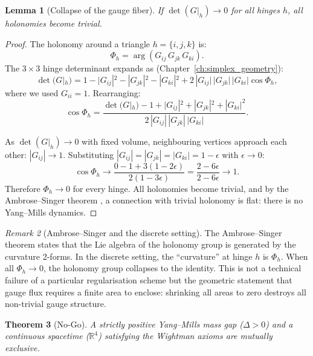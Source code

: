 \documentclass[12pt]{article}
\newtheorem{theorem}{Theorem}[section]
\newtheorem{lemma}[theorem]{Lemma}
\theoremstyle{remark}
\newtheorem{remark}[theorem]{Remark}
\theoremstyle{definition}
\newcommand{\RR}{\mathbb{R}}
\begin{document}
\begin{lemma}[Collapse of the gauge fiber]
\label{lem:fiber}
If $\det(G|_h) \to 0$ for all hinges $h$, all holonomies become
trivial.
\end{lemma}

\begin{proof}
The holonomy around a triangle $h = \{i, j, k\}$ is:
\begin{equation}
\Phi_h = \arg(G_{ij}\, G_{jk}\, G_{ki}).
\end{equation}
The $3 \times 3$ hinge determinant expands as (Chapter~\ref{ch:simplex_geometry}):
\begin{equation}
\det(G|_h) = 1 - |G_{ij}|^2 - |G_{jk}|^2 - |G_{ki}|^2
  + 2\,|G_{ij}|\,|G_{jk}|\,|G_{ki}|\cos\Phi_h,
\end{equation}
where we used $G_{ii} = 1$.  Rearranging:
\begin{equation}
\cos\Phi_h = \frac{\det(G|_h) - 1 + |G_{ij}|^2 + |G_{jk}|^2 + |G_{ki}|^2}
{2\,|G_{ij}|\,|G_{jk}|\,|G_{ki}|}.
\label{eq:cosPhidet}
\end{equation}

As $\det(G|_h) \to 0$ with fixed volume, neighbouring vertices approach
each other: $|G_{ij}| \to 1$.  Substituting
$|G_{ij}| = |G_{jk}| = |G_{ki}| = 1 - \epsilon$ with
$\epsilon \to 0$:
\begin{equation}
\cos\Phi_h \to \frac{0 - 1 + 3(1 - 2\epsilon)}{2(1 - 3\epsilon)}
= \frac{2 - 6\epsilon}{2 - 6\epsilon} \to 1.
\end{equation}
Therefore $\Phi_h \to 0$ for every hinge.  All holonomies become
trivial, and by the Ambrose--Singer theorem \cite{Ambrose-Singer},
a connection with trivial holonomy is flat: there is no Yang--Mills
dynamics.
\end{proof}

\begin{remark}[Ambrose--Singer and the discrete setting]
The Ambrose--Singer theorem states that the Lie algebra of the holonomy
group is generated by the curvature 2-forms.  In the discrete setting,
the ``curvature'' at hinge $h$ is $\Phi_h$.  When all $\Phi_h \to 0$,
the holonomy group collapses to the identity.  This is not a technical
failure of a particular regularisation scheme but the geometric statement
that gauge flux requires a finite area to enclose: shrinking all areas
to zero destroys all non-trivial gauge structure.
\end{remark}

\begin{theorem}[No-Go]
\label{thm:nogo}
A strictly positive Yang--Mills mass gap ($\Delta > 0$) and a continuous
spacetime ($\RR^4$) satisfying the Wightman axioms are mutually
exclusive.
\end{theorem}
\end{document}
